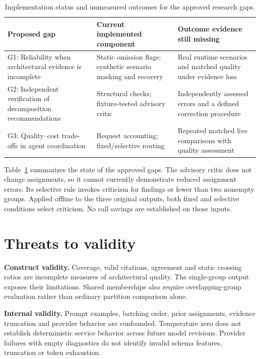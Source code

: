 \begin{table}[t]
\centering
\caption{Implementation status and unmeasured outcomes for the approved research gaps.}
\label{tab:gaps}
\begin{tabular}{@{}p{}p{}p{}@{}}
\hline
Proposed gap & Current implemented component & Outcome evidence still missing \\
\hline
G1: Reliability when architectural evidence is incomplete & Static omission flags; synthetic scenario masking and recovery & Real runtime scenarios and matched quality under evidence loss \\
G2: Independent verification of decomposition recommendations & Structural checks; fixture-tested advisory critic & Independently assessed errors and a defined correction procedure \\
G3: Quality--cost trade-offs in agent coordination & Request accounting; fixed/selective routing & Repeated matched live comparisons with quality assessment \\
\hline
\end{tabular}
\end{table}


Table~\ref{tab:gaps} summarizes the state of the approved gaps. The advisory critic does not change assignments, so it cannot currently demonstrate reduced assignment errors. Its selective rule invokes criticism for findings or fewer than two nonempty groups. Applied offline to the three original outputs, both fixed and selective conditions select criticism. No call savings are established on those inputs.

\section{Threats to validity}

\textbf{Construct validity.} Coverage, valid citations, agreement and static crossing ratios are incomplete measures of architectural quality. The single-group output exposes their limitations. Shared memberships also require overlapping-group evaluation rather than ordinary partition comparison alone.

\textbf{Internal validity.} Prompt examples, batching order, prior assignments, evidence truncation and provider behavior are confounded. Temperature zero does not establish deterministic service behavior across future model revisions. Provider failures with empty diagnostics do not identify invalid schema features, truncation or token exhaustion.

